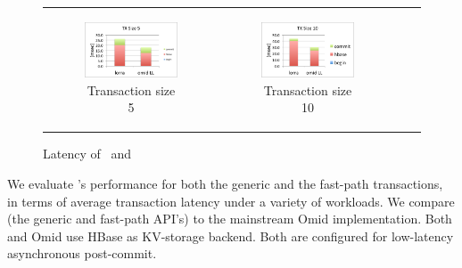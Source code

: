\begin{figure}[]
\begin{tabular}{cccc}
    \begin{subfigure}[t]{0.4\textwidth}
	\includegraphics[width=\textwidth]{figs/lorravslltx5.pdf}
    \caption[]{Transaction size 5}
    \label{fig:latency:read}
    \label{fig:latency:lorra5}
  \end{subfigure} &

  \begin{subfigure}[t]{0.4\textwidth}
	\includegraphics[width=\textwidth]{figs/lorravslltx10.pdf}
    \caption[]{Transaction size 10}
    \label{fig:latency:lorra10}
  \end{subfigure} \\
  
  \end{tabular}
  \caption{Latency of \sys\ and \sysll\ }
\end{figure}

We evaluate {\sys}'s performance for both the generic and the fast-path transactions, 
in terms of average transaction latency under a variety of workloads. We compare {\sys\/} 
(the generic and fast-path API's) to the mainstream Omid implementation. Both {\sys\/} 
and Omid use HBase as KV-storage backend. Both are configured for low-latency asynchronous 
post-commit.   

